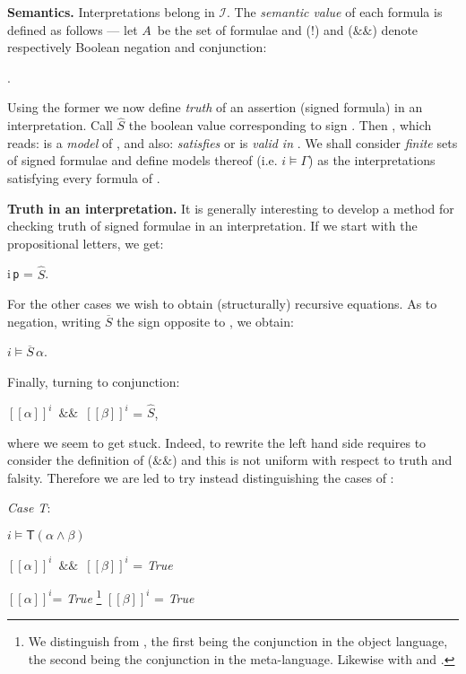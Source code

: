 \documentclass[a4paper,UKenglish]{lipics}
\newcounter{c}
\newcommand{\nentry}[1]{\noindent\textbf{#1}}
\newcommand{\note}[1]{\textsl{#1}}
\newcommand{\cnst}[1]{\textsl{#1}}
\newcommand{\lett}[1]{\texttt{#1}}
\newcommand{\sg}[1]{\textsf{#1}}
\newcommand{\formtype}{\ensuremath{A}}
\newcommand{\bnot}{\ensuremath{!}}
\newcommand{\band}{\ensuremath{\&\&}}
\newcommand{\mean}[1]{\ensuremath{\hat{#1}}}
\newcommand{\op}[1]{\ensuremath{\overline{#1}}}
\newcommand{\interprt}{\ensuremath{\mathcal{I}}}
\newcommand{\vval}[2]{\ensuremath{[\![ #1]\!]^{#2}}}
\newcommand{\sat}[2]{\ensuremath{#1\models#2}}
\begin{document}
\nentry{Semantics.} 
Interpretations belong in 
\interprt . The \textit{semantic value} of each formula is defined as follows ---
let \formtype\ be the set of formulae and (\bnot) and (\band) denote respectively Boolean negation and conjunction:



.

 Using the former we now define \textit{truth} of an assertion (signed formula) in an interpretation. 
Call \mean{S} the boolean value corresponding to sign . Then
,
\noindent which reads:  is a \textit{model} of , and also:  \textit{satisfies}  or  is \textit{valid in} .
We shall consider \emph{finite} sets  of signed formulae and define models thereof (i.e. \sat{i}{\Gamma}) as the interpretations satisfying every formula of .

\nentry{Truth in an interpretation.} 
It is generally interesting to develop a method for checking truth of signed formulae in an interpretation.
If we start with the propositional letters, we get:





i\,\lett{p} = \mean{S}.

For the other cases we wish to obtain (structurally) recursive equations.
As to negation, writing \op{S} the sign opposite to , we obtain:











\sat{i}{\op{S}\,\alpha}.

\noindent Finally, turning to conjunction:





\vval{\alpha}{i}\ \band\ \vval{\beta}{i}  = \mean{S},

\noindent where we seem to get stuck. Indeed, to rewrite the left hand side requires to consider the definition of (\band) and this is not uniform with respect to truth and falsity.  
Therefore we are led to try instead distinguishing the cases of :

\note{Case \sg{T}}:


\sat{i}{\sg{T}(\alpha\wedge\beta)} 


\vval{\alpha}{i}\ \band\ \vval{\beta}{i}  = \cnst{True}


\vval{\alpha}{i}= \cnst{True} \footnote{We distinguish  from , the first being the conjunction in the object language, the second being the conjunction in the meta-language. Likewise with  and .} \vval{\beta}{i}  = \cnst{True}
\end{document}
